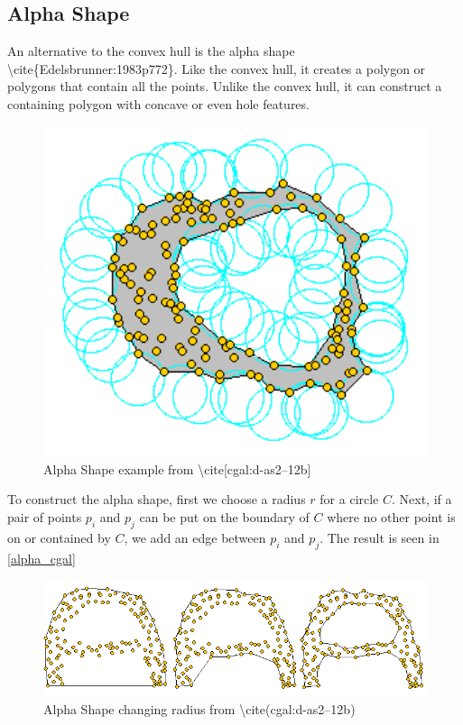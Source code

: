 

\subsection{Alpha Shape}
\label{alphashape}

An alternative to the convex hull is the alpha shape \textbackslash{}cite\{Edelsbrunner:1983p772\}. Like the convex hull, it creates a polygon or polygons that contain all the points. Unlike the convex hull, it can construct a containing polygon with concave or even hole features. 

\begin{figure}[htbp]
\centering
\includegraphics[keepaspectratio,width=400pt,height=0.75\textheight]{alphashape.png}
\caption{Alpha Shape example from \textbackslash{}cite[cgal:d-as2--12b]}
\label{alpha_cgal}
\end{figure}



To construct the alpha shape, first we choose a radius $r$ for a circle $C$. Next, if a pair of points $p_i$ and $p_j$ can be put on the boundary of $C$ where no other point is on or contained by $C$, we add an edge between $p_i$ and $p_j$. The result is seen in \autoref{alpha_cgal}

\begin{figure}[htbp]
\centering
\includegraphics[keepaspectratio,width=400pt,height=0.75\textheight]{4_alpha_radius.png}
\caption{Alpha Shape changing radius from \textbackslash{}cite(cgal:d-as2--12b)}
\label{alpha_cgal2}
\end{figure}



